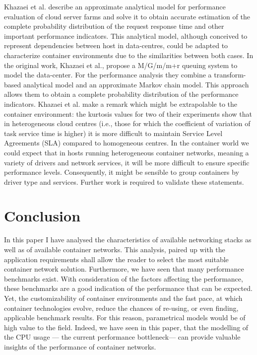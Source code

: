 \documentclass[conference]{IEEEtran}
\begin{document}
Khazaei et al. \cite{IEEE_2012:Khazaei} describe an approximate analytical model for performance evaluation of cloud server farms and solve it to obtain accurate estimation of the complete probability distribution of the request response time and other important performance indicators. This analytical model, although conceived to represent dependencies between host in data-centres, could be adapted to characterize container environments due to the similarities between both cases. In the original work, Khazaei et al., propose a M/G/m/m+r queuing system to model the data-center. For the performance analysis they combine a transform-based analytical model and an approximate Markov chain model. This approach allows them to obtain a complete probability distribution of the performance indicators. Khazaei et al. make a remark which might be extrapolable to the container environment:  the kurtosis values for two of their experiments show that in heterogeneous cloud centres (i.e., those for which the coefficient of variation of task service time is higher) it is more difficult to maintain Service Level Agreements (SLA) compared to homogeneous centres. In the container world we could expect that in hosts running heterogeneous container networks, meaning a variety of drivers and network services, it will be more difficult to ensure specific performance levels. Consequently, it might be sensible to group containers by driver type and services. Further work is required to validate these statements.
\section{Conclusion}
In this paper I have analysed the characteristics of available networking stacks as well as of available container networks. This analysis, paired up with the application requirements shall allow the reader to select the most suitable container network solution. Furthermore, we have seen that many performance benchmarks exist. With consideration of the factors affecting the performance, these benchmarks are a good indication of the performance that can be expected. Yet, the customizability of container environments and the fast pace, at which container technologies evolve, reduce the chances of re-using, or even finding, applicable benchmark results. For this reason, parametrical models would be of high value to the field. Indeed, we have seen in this paper, that the modelling of the CPU usage --- the current performance bottleneck--- can provide valuable insights of the performance of container networks.
\end{document}
